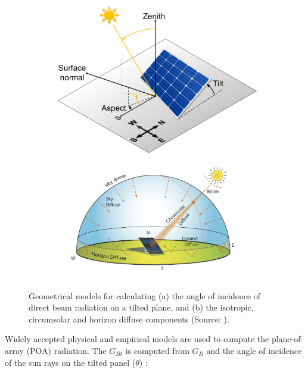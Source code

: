 \begin{figure}[htb]
\centering
\begin{subfigure}[t]{.43\textwidth}
  \centering
  \includegraphics[width=\linewidth]{images/Figs/poa.pdf}  
  \label{figa:solar_geom}
  \subcaption{}
\end{subfigure}
\begin{subfigure}[t]{.53\textwidth}
  \centering
  \includegraphics[width=\linewidth]{images/Figs/diffuse_components.png}  
  \label{figb:solar_geom}
  \subcaption{}
\end{subfigure}
\caption{Geometrical models for calculating (a) the angle of incidence of direct beam radiation on a tilted plane, and (b) the isotropic, circumsolar and horizon diffuse components (Source: \citet{brownson_44_nodate}).}
\label{fig:solar_geom}
\end{figure}


Widely accepted physical and empirical models are used to compute the plane-of-array (POA) radiation.
%
The $G_{Bt}$ is computed from $G_B$ and the angle of incidence of the sun rays on the tilted panel ($\theta$) \cite{gulin_estimation_2013}:

